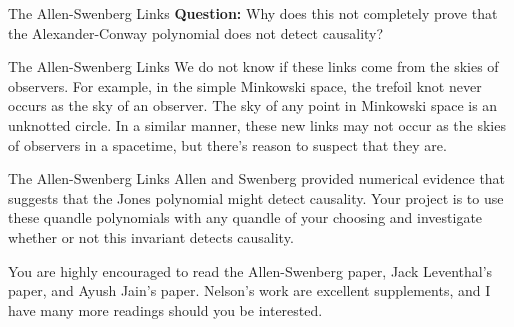 \documentclass{beamer}
\begin{document}
    \begin{frame}{The Allen-Swenberg Links}
        \textbf{Question:} Why does this not completely prove that
        the Alexander-Conway polynomial does not detect causality?
    \end{frame}
    \begin{frame}{The Allen-Swenberg Links}
        We do not know if these links come from the skies of observers.
        For example, in the simple Minkowski space, the trefoil knot never
        occurs as the sky of an observer. The sky of any point in Minkowski
        space is an unknotted circle. In a similar manner, these new links
        may not occur as the skies of observers in a spacetime, but there's
        reason to suspect that they are.
    \end{frame}
    \begin{frame}{The Allen-Swenberg Links}
        Allen and Swenberg provided numerical evidence that suggests that
        the Jones polynomial might detect causality. Your project is to use
        these quandle polynomials with any quandle of your choosing and
        investigate whether or not this invariant detects causality.
        \par\hfill\par
        You are highly encouraged to read the Allen-Swenberg paper,
        Jack Leventhal's paper, and Ayush Jain's paper. Nelson's work are
        excellent supplements, and I have many more readings should you be
        interested.
    \end{frame}
\end{document}
